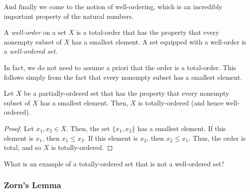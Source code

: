 And finally we come to the notion of well-ordering, which is an incredibly important property of the natural numbers.
\begin{dfn}
A \emph{well-order} on a set $X$ is a total-order that has the property that every nonempty subset of $X$ has a smallest element.  A set equipped with a well-order is a \emph{well-ordered set}. 
\end{dfn}
In fact, we do not need to assume a priori that the order is a total-order.  This follows simply from the fact that every nonempty subset has a smallest element.
\begin{prp}\label{prpA.1.51}
Let $X$ be a partially-ordered set that has the property that every nonempty subset of $X$ has a smallest element.  Then, $X$ is totally-ordered (and hence well-ordered).
\begin{proof}
Let $x_1,x_2\in X$.  Then, the set $\{ x_1,x_2\}$ has a smallest element.  If this element is $x_1$, then $x_1\leq x_2$.  If this element is $x_2$, then $x_2\leq x_1$.  Thus, the order is total, and so $X$ is totally-ordered.
\end{proof}
\end{prp}
\begin{exr}
What is an example of a totally-ordered set that is not a well-ordered set?
\end{exr}

\subsubsection{Zorn's Lemma}

